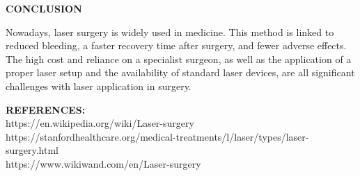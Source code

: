 \documentclass[12pt]{article}
\begin{document}
\newpage
\pagestyle{fancy}
\begin{center}
    \textsc{\huge\textbf{CONCLUSION}}
\end{center}
 
 \indent

\Large

\hspace{2.5CM}Nowadays, laser surgery is widely used in medicine. This method is linked to reduced bleeding, a faster recovery time after surgery, and fewer adverse effects. The high cost and reliance on a specialist surgeon, as well as the application of a proper laser setup and the availability of standard laser devices, are all significant challenges with laser application in surgery.


\newpage

\textbf{REFERENCES:}
\\

 {https://en.wikipedia.org/wiki/Laser-surgery}\\

 { https://stanfordhealthcare.org/medical-treatments/l/laser/types/laser-surgery.html}\\

 {https://www.wikiwand.com/en/Laser-surgery}
\end{document}
